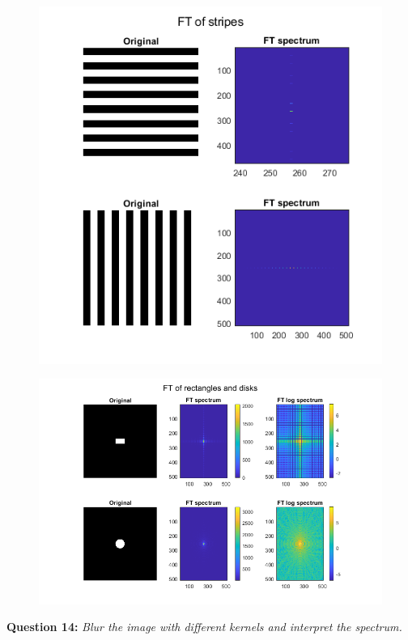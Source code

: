 
\begin{figure}[H]
    \centering
    \includegraphics[width=0.75\linewidth]{Doc/Graphics/Part1/part1_Question13b.png}
\end{figure}

\begin{figure}[H]
    \centering
    \includegraphics[width=\linewidth]{Doc/Graphics/Part1/Part1_Question13a.png}
\end{figure}




\textbf{Question 14:}
\textit{Blur the image with diﬀerent kernels and interpret the spectrum.}

